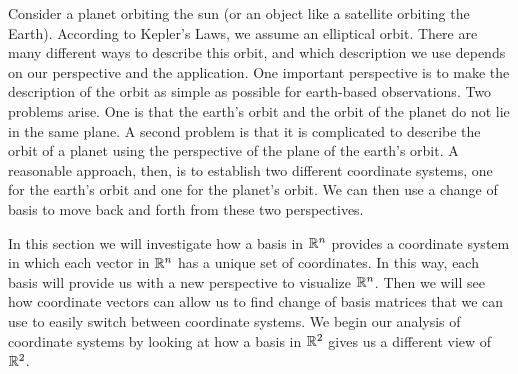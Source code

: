   \label{chap:coordinate_vectors}

\vspace*{-17 pt}

\vspace*{13 pt}

\label{sec:appl_orbits}

Consider a planet orbiting the sun (or an object like a satellite orbiting the Earth). According to Kepler's Laws, we assume an elliptical orbit. There are many different ways to describe this orbit, and which description we use depends on our perspective and the application. One important perspective is to make the description of the orbit as simple as possible for earth-based observations. Two problems arise. One is that the earth's orbit and the orbit of the planet do not lie in the same plane. A second problem is that it is complicated to describe the orbit of a planet using the perspective of the plane of the earth's orbit. A reasonable approach, then, is to establish two different coordinate systems, one for the earth's orbit and one for the planet's orbit. We can then use a change of basis to move back and forth from these two perspectives. 


\label{sec:cob_intro}

In this section we will investigate how a basis in $\mathbb{R}^n$ provides a coordinate system in which each vector in $\mathbb{R}^n$ has a unique set of coordinates. In this way, each basis will provide us with a new perspective to visualize $\mathbb{R}^n$. Then we will see how coordinate vectors can allow us to find change of basis matrices that we can use to easily switch between coordinate systems. We begin our analysis of coordinate systems by looking at how a basis in $\mathbb{R}^2$ gives us a different view of $\mathbb{R}^2$. 

